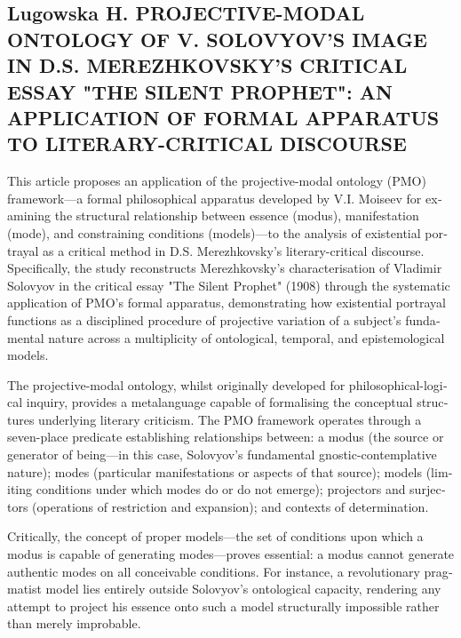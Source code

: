 \ifprintabstract
    \begin{english}
    \subsection{Lugowska H. PROJECTIVE-MODAL ONTOLOGY OF V. SOLOVYOV'S IMAGE IN D.S. MEREZHKOVSKY'S CRITICAL ESSAY "THE SILENT PROPHET": AN APPLICATION OF FORMAL APPARATUS TO LITERARY-CRITICAL DISCOURSE}
    \label{subsec:lugowska-en}

    {\itshape }

    This article proposes an application of the projective-modal ontology (PMO) framework—a formal philosophical apparatus developed by V.I. Moiseev for examining the structural relationship between essence (modus), manifestation (mode), and constraining conditions (models)—to the analysis of existential portrayal as a critical method in D.S. Merezhkovsky's literary-critical discourse. Specifically, the study reconstructs Merezhkovsky's characterisation of Vladimir Solovyov in the critical essay "The Silent Prophet" (1908) through the systematic application of PMO's formal apparatus, demonstrating how existential portrayal functions as a disciplined procedure of projective variation of a subject's fundamental nature across a multiplicity of ontological, temporal, and epistemological models.

    The projective-modal ontology, whilst originally developed for philosophical-logical inquiry, provides a metalanguage capable of formalising the conceptual structures underlying literary criticism. The PMO framework operates through a seven-place predicate establishing relationships between: a modus (the source or generator of being—in this case, Solovyov's fundamental gnostic-contemplative nature); modes (particular manifestations or aspects of that source); models (limiting conditions under which modes do or do not emerge); projectors and surjectors (operations of restriction and expansion); and contexts of determination.

    Critically, the concept of proper models—the set of conditions upon which a modus is capable of generating modes—proves essential: a modus cannot generate authentic modes on all conceivable conditions. For instance, a revolutionary pragmatist model lies entirely outside Solovyov's ontological capacity, rendering any attempt to project his essence onto such a model structurally impossible rather than merely improbable.


\end{english}
